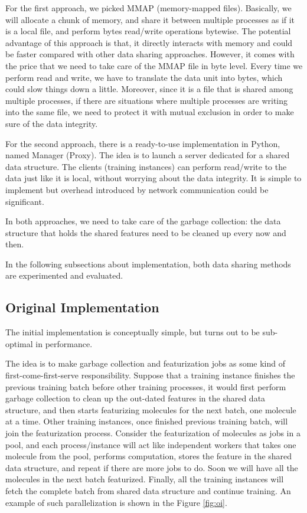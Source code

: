 \documentclass[conference]{IEEEtran}
\begin{document}
For the first approach, we picked MMAP (memory-mapped files). 
Basically, we will allocate a chunk of memory, and share it between multiple processes as if it is a local file, and perform bytes read/write operations bytewise. 
The potential advantage of this approach is that, it directly interacts with memory and could be faster compared with other data sharing approaches. 
However, it comes with the price that we need to take care of the MMAP file in byte level. Every time we perform read and write, we have to translate the data unit into bytes, which could slow things down a little. 
Moreover, since it is a file that is shared among multiple processes, if there are situations where multiple processes are writing into the same file, we need to protect it with mutual exclusion in order to make sure of the data integrity. 

For the second approach, there is a  ready-to-use implementation in Python, named Manager (Proxy). 
The idea is to launch a server dedicated for a shared data structure. 
The clients (training instances) can perform read/write to the data just like it is local, without worrying about the data integrity. 
It is simple to implement but overhead introduced by network communication could be significant. 

In both approaches, we need to take care of the garbage collection: the data structure that holds the shared features need to be cleaned up every now and then.

In the following subsections about implementation, both data sharing methods are experimented and evaluated.


\subsection{Original Implementation} \label{subsec_oi}

The initial implementation is conceptually simple, but turns out to be sub-optimal in performance. 

The idea is to make garbage collection and featurization jobs as some kind of first-come-first-serve responsibility. 
Suppose that a training instance finishes the previous training batch before other training processes, it would first perform garbage collection to clean up the out-dated features in the shared data structure, and then starts featurizing molecules for the next batch, one molecule at a time.
Other training instances, once finished previous training batch, will join the featurization process. 
Consider the featurization of molecules as jobs in a pool, and each process/instance will act like independent workers that takes one molecule from the pool, performs computation, stores the feature in the shared data structure, and repeat if there are more jobs to do.
Soon we will have all the molecules in the next batch featurized. 
Finally, all the training instances will fetch the complete batch from shared data structure and continue training. 
An example of such parallelization is shown in the Figure \ref{fig:oi}. 
\end{document}
